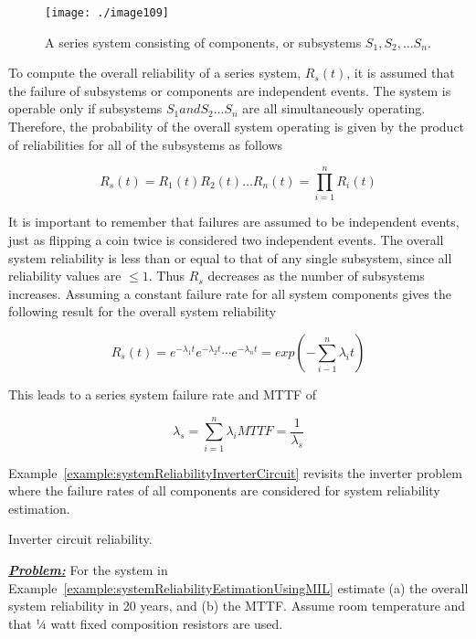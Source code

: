 {\begin{figure}[h]
\centering
\texttt{[image: ./image109]}
\caption{A series system consisting of components, or subsystems $S_1, S_2, \ldots S_n$.}
\label{figure:seriesSystems}
\end{figure}

To compute the overall reliability of a series system, $R_s(t)$, 
it is assumed that the failure
of subsystems or components are independent events. The system is
operable only if subsystems $S_1 and S_2 \ldots S_n$ are all simultaneously
operating. Therefore, the probability of the overall system operating is
given by the product of reliabilities for all of the subsystems as
follows

\begin{equation}
\label{equ:systemReliabilitySeriesProbability}
R_s(t) = R_1(t)R_2(t)\ldots R_n(t) = \prod_{i=1}^n R_i(t) 
\end{equation}

It is important to remember that failures are assumed to be independent
events, just as flipping a coin twice is considered two independent
events. The overall system reliability is less than or equal to that of
any single subsystem, since all reliability values are $\leq 1$. Thus
$R_s$ decreases as the number of
subsystems increases. Assuming a constant failure rate for all system
components gives the following result for the overall system reliability

\begin{equation}
\label{equ:seriesProbabilityConstantErrorRate}
R_s(t) = e^{-\lambda_1t}e^{-\lambda_2t}\cdots e^{-\lambda_nt} = exp(-\sum_{i-1}^n \lambda_i t)
\end{equation}

This leads to a series system failure rate and MTTF of


\begin{equation}
\label{equ:seriesProbabilityMttf}
\lambda_s = \sum_{i=1}^n \lambda_i
MTTF = \frac{1}{\lambda_s}
\end{equation}

Example~\ref{example:systemReliabilityInverterCircuit} 
revisits the inverter problem where the failure rates of all
components are considered for system reliability estimation.


\begin{example}{Inverter circuit reliability.}
\label{example:systemReliabilityInverterCircuit}

\emph{\textbf{\ul{Problem:}}} For the system in 
Example~\ref{example:systemReliabilityEstimationUsingMIL} estimate (a)
the overall system reliability in 20 years, and (b) the MTTF. Assume
room temperature and that ¼ watt fixed composition resistors are used.\\


\end{example}}
